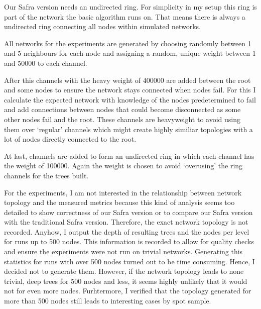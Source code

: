   Our Safra version needs an undirected ring. 
  For simplicity in my setup this ring is part of the network the basic algorithm runs on. 
  That means there is always a undirected ring connecting all nodes within simulated networks.
  
  All networks for the experiments are generated by choosing randomly between 1 and 5 neighbours for each node and assigning a random, unique weight between 1 and 50000 to each channel.
  
  After this channels with the heavy weight of 400000 are added between the root and some nodes to ensure the network stays connected when nodes fail.
  For this I calculate the expected network with knowledge of the nodes predetermined to fail and add connections between nodes that could become disconnected as some other nodes fail and the root.
  These channels are  heavyweight to avoid using them over `regular' channels which might create highly similiar topologies with a lot of nodes directly connected to the root.
  
  At last, channels are added to form an undirected ring in which each channel has the weight of 100000. 
  Again the weight is chosen to avoid `overusing' the ring channels for the trees built.
  
  For the experiments, I am not interested in the relationship between network topology and the measured metrics because this kind of analysis seems too detailed to show correctness of our Safra version or to compare
  our Safra version with the traditional Safra version.
  Therefore, the exact network topology is not recorded. 
  Anyhow, I output the depth of resulting trees and the nodes per level for runs up to 500 nodes.
  This information is recorded to allow for quality checks and ensure the experiments were not run on trivial networks.
  Generating this statistics for runs with over 500 nodes turned out to be time consuming.
  Hence, I decided not to generate them.
  However, if the network topology leads to none trivial, deep trees for 500 nodes and less, it seems highly unlikely that it would not for even more nodes.
  Furhtermore, I verified that the topology generated for more than 500 nodes still leads to interesting cases by spot sample.
  